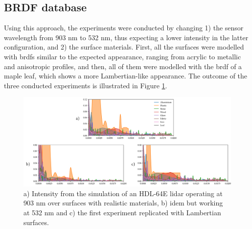 \subsection{BRDF database}

Using this approach, the experiments were conducted by changing 1) the sensor wavelength from 903 \si{\nano\meter} to 532 \si{\nano\meter}, thus expecting a lower intensity in the latter configuration, and 2) the surface materials. First, all the surfaces were modelled with \acrshort{brdf}s similar to the expected appearance, ranging from acrylic to metallic and anisotropic profiles, and then, all of them were modelled with the \acrshort{brdf} of a maple leaf, which shows a more Lambertian-like appearance. The outcome of the three conducted experiments is illustrated in Figure \ref{fig:database_intensity_results}. 

\begin{figure}[ht]
	\centering
	\includegraphics[width=\linewidth]{figs/lidar_intensity/database_intensity_chart.png}
	\caption{a) Intensity from the simulation of an HDL-64E \acrshort{lidar} operating at 903 \si{\nano\meter} over surfaces with realistic materials, b) idem but working at 532 \si{\nano\meter} and c) the first experiment replicated with Lambertian surfaces. }
	\label{fig:database_intensity_results}
\end{figure}

